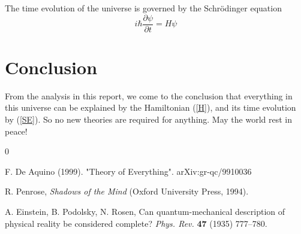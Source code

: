 \documentclass[12pt]{article}
\begin{document}
The time evolution of the universe is governed by the Schr\"odinger equation
\begin{equation}
i\hbar \frac{\partial \psi}{\partial t} = H \psi
\label{SE}
\end{equation}
\section{Conclusion}

From the analysis in this report, we come to the conclusion that
everything in this universe can be explained by the Hamiltonian (\ref{H}),
and its time
evolution by (\ref{SE}). So no new theories are required for anything.
May the world rest in peace!

\newpage
\cleardoublepage

\begin{thebibliography}{0}

 F. De Aquino (1999). "Theory of Everything". arXiv:gr-qc/9910036

 R. Penrose, {\it Shadows of the Mind} (Oxford
University Press, 1994).

 A. Einstein, B. Podolsky, N. Rosen, Can quantum-mechanical
description of physical reality be considered complete?
\textit{Phys. Rev.} {\bf 47} (1935) 777--780.

\end{thebibliography}
\end{document}
